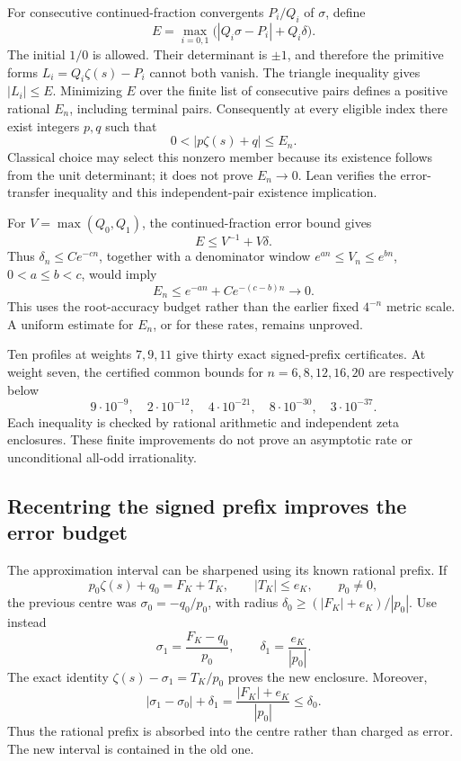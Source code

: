\documentclass[11pt]{article}
\theoremstyle{remark}
\begin{document}
For consecutive continued-fraction convergents \(P_i/Q_i\) of
\(\sigma\), define
\[
 E=\max_{i=0,1}\bigl(|Q_i\sigma-P_i|+Q_i\delta\bigr).
\]
The initial \(1/0\) is allowed. Their determinant is \(\pm1\),
and therefore the primitive forms \(L_i=Q_i\zeta(s)-P_i\)
cannot both vanish. The triangle inequality gives \(|L_i|\le E\).
Minimizing \(E\) over the finite list of consecutive pairs defines
a positive rational \(E_n\), including terminal pairs. Consequently
at every eligible index there exist integers \(p,q\) such that
\[
 0<|p\zeta(s)+q|\le E_n.
\]
Classical choice may select this nonzero member because its existence
follows from the unit determinant; it does not prove \(E_n\to0\).
Lean verifies the error-transfer inequality and this independent-pair
existence implication.

For \(V=\max(Q_0,Q_1)\), the continued-fraction error bound gives
\[
 E\le V^{-1}+V\delta.
\]
Thus \(\delta_n\le Ce^{-cn}\), together with a denominator window
\(e^{an}\le V_n\le e^{bn}\), \(0<a\le b<c\), would imply
\[
 E_n\le e^{-an}+Ce^{-(c-b)n}\longrightarrow0.
\]
This uses the root-accuracy budget rather than the earlier fixed
\(4^{-n}\) metric scale. A uniform estimate for \(E_n\), or for
these rates, remains unproved.

Ten profiles at weights \(7,9,11\) give thirty exact signed-prefix
certificates. At weight seven, the certified common bounds for
\(n=6,8,12,16,20\) are respectively below
\[
 9\cdot10^{-9},\quad 2\cdot10^{-12},\quad4\cdot10^{-21},
 \quad8\cdot10^{-30},\quad3\cdot10^{-37}.
\]
Each inequality is checked by rational arithmetic and independent zeta
enclosures. These finite improvements do not prove an asymptotic rate
or unconditional all-odd irrationality.

\subsection{Recentring the signed prefix improves the error budget}
The approximation interval can be sharpened using its known rational
prefix. If
\[
 p_0\zeta(s)+q_0=F_K+T_K,\qquad |T_K|\le e_K,\qquad p_0\ne0,
\]
the previous centre was \(\sigma_0=-q_0/p_0\), with radius
\(\delta_0\ge(|F_K|+e_K)/|p_0|\). Use instead
\[
 \sigma_1=\frac{F_K-q_0}{p_0},\qquad
 \delta_1=\frac{e_K}{|p_0|}.
\]
The exact identity \(\zeta(s)-\sigma_1=T_K/p_0\) proves the
new enclosure. Moreover,
\[
 |\sigma_1-\sigma_0|+\delta_1
   =\frac{|F_K|+e_K}{|p_0|}\le\delta_0.
\]
Thus the rational prefix is absorbed into the centre rather than
charged as error. The new interval is contained in the old one.
\end{document}

